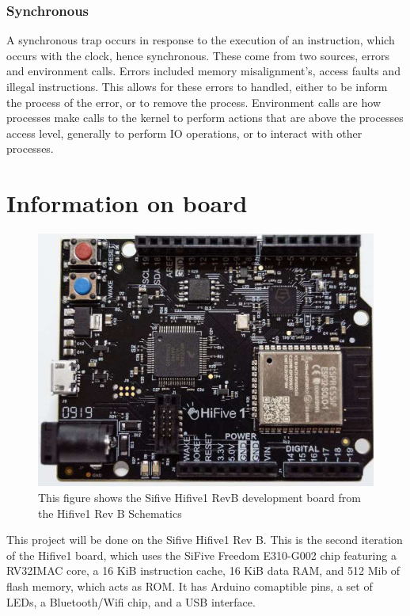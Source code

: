 \subsubsection{Synchronous}
A synchronous trap occurs in response to the execution of an instruction, which occurs with the clock, hence synchronous. These come from two sources, errors and environment calls. Errors included memory misalignment's, access faults and illegal instructions. This allows for these errors to handled, either to be inform the process of the error, or to remove the process. Environment calls are how processes make calls to the kernel to perform actions that are above the processes access level, generally to perform IO operations, or to interact with other processes.
\section{Information on board}
\begin{figure}[H]
    \includegraphics[width=0.6\columnwidth]{figures/board_image.png}
    \centering
    \caption[Sifive Hifive1 RevB]{This figure shows the Sifive Hifive1 RevB development board from the Hifive1 Rev B Schematics\cite{sifive_schematics}}
\end{figure}
This project will be done on the Sifive Hifive1 Rev B. This is the second iteration of the Hifive1 board, which uses the SiFive Freedom E310-G002 chip featuring a RV32IMAC core, a 16 KiB instruction cache, 16 KiB data RAM, and 512 Mib of flash memory, which acts as ROM. It has Arduino comaptible pins, a set of LEDs, a Bluetooth/Wifi chip, and a USB interface.